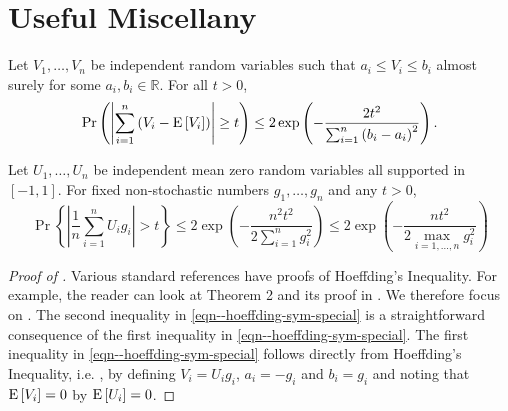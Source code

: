 
\section{Useful Miscellany}

\begin{lemma}
\label{lem--hoeffding-ineq}
Let \(V_{1}, \dots, V_{n}\) be independent random variables such that \(a_{i}
\leq V_{i} \leq b_{i}\) almost surely for some \(a_{i}, b_{i} \in \mathbb{R}\).
For all \(t > 0\),
\begin{equation*}
  \mathrm{Pr} \left( \left| \sum_{i = 1}^{n} \left( V_{i} - \mathrm{E} \left[ V_{i} \right]
  \right) \right| \geq t \right) \leq
  2 \exp \left( - \frac{2 t^{2}}{\sum_{i = 1}^{n} \left( b_{i} -
  a_{i} \right)^{2}} \right).
\end{equation*}
\end{lemma}

\begin{lemma}
\label{lem--hoeffding-sym-special}
Let \(U_{1}, \dots, U_{n}\) be independent mean zero random variables all
supported in \([- 1, 1]\).
For fixed non-stochastic numbers \(g_{1}, \dots, g_{n}\) and any \(t > 0\),
\begin{equation}
  \Pr \left\{ \left| \frac{1}{n} \sum_{i = 1}^{n} U_{i} g_{i} \right| > t
  \right\} \leq 2 \exp \left( - \frac{n^{2} t^{2}}{2 \sum_{i = 1}^{n} g_{i}^{2}}
  \right) \leq
  2 \exp \left( - \frac{n t^{2}}{2 \max_{i = 1, \dots, n} g_{i}^{2}} \right)
  \label{eqn--hoeffding-sym-special}
\end{equation}
\end{lemma}

\begin{proof}[Proof of ]
Various standard references have proofs of Hoeffding's Inequality.
For example, the reader can look at Theorem 2 and its proof in \citet[Appendix
B, pp. 191-192]{1984pollardConvergenceStochasticProcesses}.
We therefore focus on .
The second inequality in \eqref{eqn--hoeffding-sym-special} is a straightforward
consequence of the first inequality in \eqref{eqn--hoeffding-sym-special}.
The first inequality in \eqref{eqn--hoeffding-sym-special} follows directly from
Hoeffding's Inequality, i.e. , by defining
\(V_{i} = U_{i} g_{i}\), \(a_{i} = - g_{i}\) and \(b_{i} = g_{i}\) and noting
that \(\mathrm{E} \left[ V_{i} \right] = 0\) by \(\mathrm{E} \left[ U_{i} \right] = 0\).
\end{proof}

